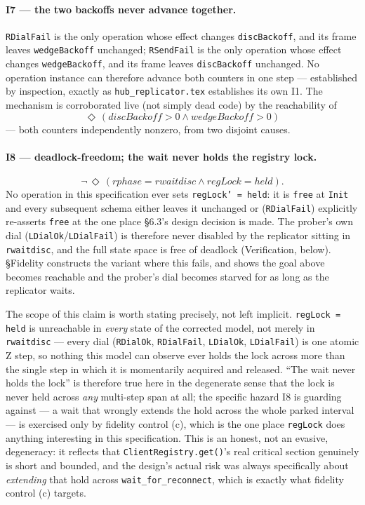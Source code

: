 \documentclass[a4paper,10pt,fleqn]{article}
\begin{document}
\paragraph{I7 --- the two backoffs never advance together.}
\texttt{RDialFail} is the only operation whose effect changes
\texttt{discBackoff}, and its frame leaves \texttt{wedgeBackoff} unchanged;
\texttt{RSendFail} is the only operation whose effect changes
\texttt{wedgeBackoff}, and its frame leaves \texttt{discBackoff} unchanged.
No operation instance can therefore advance both counters in one step ---
established by inspection, exactly as \texttt{hub\_replicator.tex}
establishes its own I1.  The mechanism is corroborated live (not simply
dead code) by the reachability of
\[
  \Diamond\,(discBackoff > 0 \land wedgeBackoff > 0)
\]
--- both counters independently nonzero, from two disjoint causes.

\paragraph{I8 --- deadlock-freedom; the wait never holds the registry
lock.}
\[
  \lnot\,\Diamond\,(rphase = rwaitdisc \land regLock = held).
\]
No operation in this specification ever sets \texttt{regLock' = held}: it
is \texttt{free} at \texttt{Init} and every subsequent schema either leaves
it unchanged or (\texttt{RDialFail}) explicitly re-asserts \texttt{free} at
the one place \S6.3's design decision is made.  The prober's own dial
(\texttt{LDialOk}/\texttt{LDialFail}) is therefore never disabled by the
replicator sitting in \texttt{rwaitdisc}, and the full state space is free
of deadlock (Verification, below).  \S Fidelity constructs the variant
where this fails, and shows the goal above becomes reachable and the
prober's dial becomes starved for as long as the replicator waits.

The scope of this claim is worth stating precisely, not left implicit.
\texttt{regLock = held} is unreachable in \emph{every} state of the
corrected model, not merely in \texttt{rwaitdisc} --- every dial
(\texttt{RDialOk}, \texttt{RDialFail}, \texttt{LDialOk}, \texttt{LDialFail})
is one atomic Z step, so nothing this model can observe ever holds the
lock across more than the single step in which it is momentarily
acquired and released.  ``The wait never holds the lock'' is therefore
true here in the degenerate sense that the lock is never held across
\emph{any} multi-step span at all; the specific hazard I8 is guarding
against --- a wait that wrongly extends the hold across the whole parked
interval --- is exercised only by fidelity control (c), which is the one
place \texttt{regLock} does anything interesting in this specification.
This is an honest, not an evasive, degeneracy: it reflects that
\texttt{ClientRegistry.get()}'s real critical section genuinely is short
and bounded, and the design's actual risk was always specifically about
\emph{extending} that hold across \texttt{wait\_for\_reconnect}, which is
exactly what fidelity control (c) targets.
\end{document}
